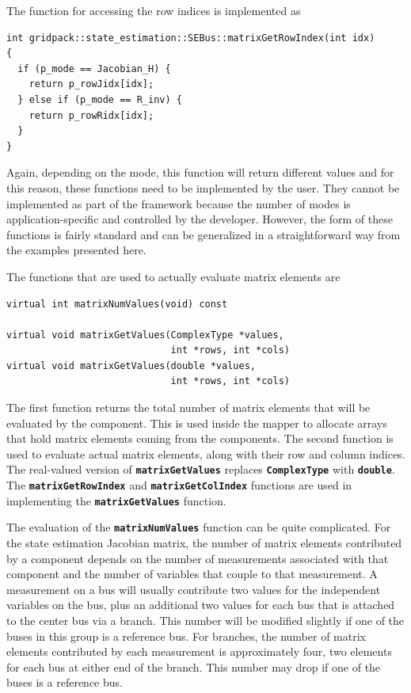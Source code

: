 The function for accessing the row indices is implemented as

{
\color{red}
\begin{Verbatim}[fontseries=b]
int gridpack::state_estimation::SEBus::matrixGetRowIndex(int idx)
{
  if (p_mode == Jacobian_H) {
    return p_rowJidx[idx];
  } else if (p_mode == R_inv) {
    return p_rowRidx[idx];
  }
}
\end{Verbatim}
}

Again, depending on the mode, this function will return different values and for
this reason, these functions need to be implemented by the user. They cannot be
implemented as part of the framework because the number of modes is
application-specific and controlled by the developer. However, the form of these
functions is fairly standard and can be generalized in a straightforward way
from the examples presented here.

The functions that are used to actually evaluate matrix elements are

{
\color{red}
\begin{Verbatim}[fontseries=b]
virtual int matrixNumValues(void) const

virtual void matrixGetValues(ComplexType *values,
                             int *rows, int *cols)
virtual void matrixGetValues(double *values,
                             int *rows, int *cols)
\end{Verbatim}
}

The first function returns the total number of matrix elements that will be
evaluated by the component. This is used inside the mapper to allocate arrays
that hold matrix elements coming from the components. The second function is
used to evaluate actual matrix elements, along with their row and column
indices. The real-valued version of \texttt{\textbf{matrixGetValues}} replaces
\texttt{\textbf{ComplexType}} with \texttt{\textbf{double}}.
The \texttt{\textbf{matrixGetRowIndex}} and \texttt{\textbf{matrixGetColIndex}}
functions are used in implementing the \texttt{\textbf{matrixGetValues}} function.

The evaluation of the \texttt{\textbf{matrixNumValues}} function can be quite complicated. For the state estimation Jacobian matrix, the number of matrix elements contributed by a component depends on the number of measurements associated with that component and the number of variables that couple to that measurement. A measurement on a bus will usually contribute two values for the independent variables on the bus, plus an additional two values for each bus that is attached to the center bus via a branch. This number will be modified slightly if one of the buses in this group is a reference bus. For branches, the number of matrix elements contributed by each measurement is approximately four, two elements for each bus at either end of the branch. This number may drop if one of the buses is a reference bus.

